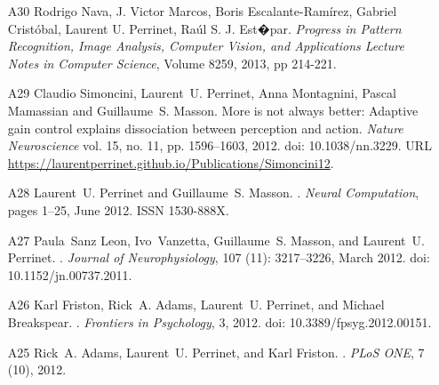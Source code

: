 \documentclass[11pt,french,a4paper,oneside]{article}%
\newcommand{\years}[1]{\marginpar{\textit{\scriptsize #1}}}
\providecommand{\doi}[1]{doi: #1}%
\begin{document}
\begin{enumerate}
\item[A30] %
Rodrigo Nava, J. Victor Marcos, Boris Escalante-Ram\'irez, Gabriel Crist\'obal, Laurent U. Perrinet, Ra\'ul S. J. Est�par.
\newblock \emph{Progress in Pattern Recognition, Image Analysis, Computer Vision, and Applications
Lecture Notes in Computer Science},  Volume 8259, 2013, pp 214-221.

\item[A29] %
Claudio Simoncini, \years{2012} Laurent~U. Perrinet, Anna Montagnini, Pascal Mamassian and Guillaume~S. Masson.
\newblock More is not always better: Adaptive gain control explains dissociation between perception and action.
\newblock \emph{Nature Neuroscience}
\newblock vol. 15, no. 11, pp. 1596--1603, 2012.
\newblock \doi{10.1038/nn.3229}.
\newblock URL \url{https://laurentperrinet.github.io/Publications/Simoncini12}.

\item[A28] %
Laurent~U. Perrinet and Guillaume~S. Masson.
.
\newblock \emph{Neural Computation}, pages 1--25, June 2012.
\newblock ISSN 1530-888X.

\item[A27] %
Paula~Sanz Leon, Ivo~Vanzetta, Guillaume~S. Masson, and Laurent~U. Perrinet.
.
\newblock \emph{Journal of Neurophysiology}, 107 (11):
  3217--3226, March 2012.
\newblock \doi{10.1152/jn.00737.2011}.

\item[A26] %
Karl Friston, Rick~A. Adams, Laurent~U. Perrinet, and Michael Breakspear.
.
\newblock \emph{Frontiers in Psychology}, 3, 2012.
\newblock \doi{10.3389/fpsyg.2012.00151}.

\item[A25] %
Rick~A. Adams, Laurent~U. Perrinet, and Karl Friston.
.
\newblock \emph{PLoS ONE}, 7 (10),  2012.


\end{enumerate}
\end{document}
